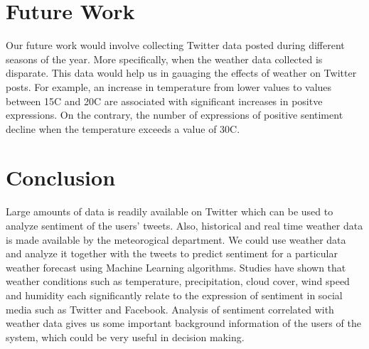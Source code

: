\documentclass[a4paper,10pt]{article}
\begin{document}
    \section{Future Work}  
    Our future work would involve collecting Twitter data posted during different seasons of the year. More specifically, when the weather data collected is disparate. This data would help us in gauaging the effects of weather on Twitter posts.  For example, an increase in temperature from lower values to values between 15C and 20C are associated with significant increases in positve expressions. On the contrary, the number of expressions of positive sentiment decline when the temperature exceeds a value of 30C. 


    \section{Conclusion}

     Large amounts of data is readily available on Twitter which can be used to analyze sentiment of the users' tweets. Also, historical and real time weather data is made available by the meteorogical department. We could use weather data and analyze it together with the tweets to predict sentiment for a particular weather forecast using Machine Learning algorithms. Studies have shown that weather conditions such as temperature, precipitation, cloud cover, wind speed and humidity each significantly relate to the expression of sentiment in social media such as Twitter and Facebook. Analysis of sentiment correlated with weather data gives us some important background information of the users of the system, which could be very useful in decision making.
\end{document}
